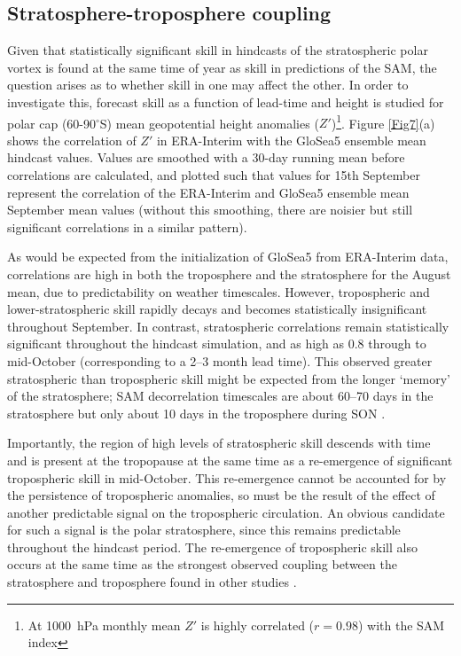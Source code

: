 \subsection{Stratosphere-troposphere coupling}

Given that statistically significant skill in hindcasts of the stratospheric polar vortex is found at the same time of year as skill in predictions of the SAM, the question arises as to whether skill in one may affect the other. In order to investigate this, forecast skill as a function of lead-time and height is studied for polar cap (60-90$^{\circ}$S)  mean geopotential height anomalies ($Z'$)\footnote{At 1000~hPa monthly mean $Z'$ is highly correlated ($r=0.98$) with the SAM index}. Figure \ref{Fig7}(a) shows the correlation of $Z'$ in ERA-Interim with the GloSea5 ensemble mean hindcast values. Values are smoothed with a 30-day running mean before correlations are calculated, and plotted such that values for 15th September represent the correlation of the ERA-Interim and GloSea5 ensemble mean September mean values (without this smoothing, there are noisier but still significant correlations in a similar pattern). 

As would be expected from the initialization of GloSea5 from ERA-Interim data, correlations are high in both the troposphere and the stratosphere for the August mean, due to predictability on weather timescales. However, tropospheric and lower-stratospheric skill rapidly decays and becomes statistically insignificant throughout September. In contrast, stratospheric correlations remain statistically significant throughout the hindcast simulation, and as high as 0.8 through to mid-October (corresponding to a 2--3 month lead time). This observed greater stratospheric than tropospheric skill might be expected from the longer `memory' of the stratosphere; SAM decorrelation timescales are about 60--70 days in the stratosphere but only about 10 days in the troposphere during SON \citep{Simpson2011}. 

Importantly, the region of high levels of stratospheric skill descends with time and is present at the tropopause at the same time as a re-emergence of significant tropospheric skill in mid-October. This re-emergence cannot be accounted for by the persistence of tropospheric anomalies, so must be the result of the effect of another predictable signal on the tropospheric circulation. An obvious candidate for such a signal is the polar stratosphere, since this remains predictable throughout the hindcast period. The re-emergence of tropospheric skill also occurs at the same time as the strongest observed coupling between the stratosphere and troposphere found in other studies \citep[e.g.,][]{Thompson2005, Simpson2011}.


